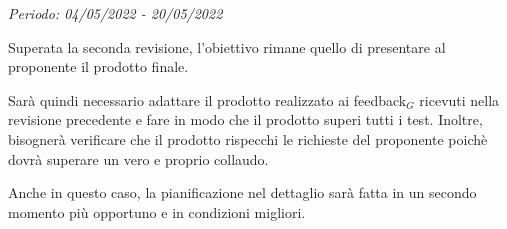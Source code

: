 \textit{Periodo: 04/05/2022 - 20/05/2022}

Superata la seconda revisione, l'obiettivo rimane quello di presentare al proponente il prodotto finale.

Sarà quindi necessario adattare il prodotto realizzato ai feedback$_G$ ricevuti nella revisione precedente e fare in modo che il prodotto superi tutti i test. Inoltre, bisognerà
verificare che il prodotto rispecchi le richieste del proponente poichè dovrà superare un vero e proprio collaudo.

Anche in questo caso, la pianificazione nel dettaglio sarà fatta in un secondo momento più opportuno e in condizioni migliori.
